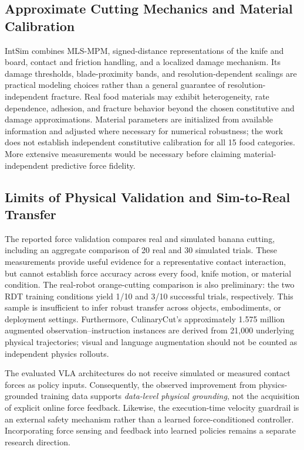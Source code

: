 \subsection{Approximate Cutting Mechanics and Material Calibration}
IntSim combines MLS-MPM, signed-distance representations of the knife and board, contact and friction handling, and a localized damage mechanism. Its damage thresholds, blade-proximity bands, and resolution-dependent scalings are practical modeling choices rather than a general guarantee of resolution-independent fracture. Real food materials may exhibit heterogeneity, rate dependence, adhesion, and fracture behavior beyond the chosen constitutive and damage approximations. Material parameters are initialized from available information and adjusted where necessary for numerical robustness; the work does not establish independent constitutive calibration for all 15 food categories. More extensive measurements would be necessary before claiming material-independent predictive force fidelity.

\subsection{Limits of Physical Validation and Sim-to-Real Transfer}
The reported force validation compares real and simulated banana cutting, including an aggregate comparison of 20 real and 30 simulated trials. These measurements provide useful evidence for a representative contact interaction, but cannot establish force accuracy across every food, knife motion, or material condition. The real-robot orange-cutting comparison is also preliminary: the two RDT training conditions yield 1/10 and 3/10 successful trials, respectively. This sample is insufficient to infer robust transfer across objects, embodiments, or deployment settings. Furthermore, CulinaryCut's approximately 1.575 million augmented observation--instruction instances are derived from 21,000 underlying physical trajectories; visual and language augmentation should not be counted as independent physics rollouts.

The evaluated VLA architectures do not receive simulated or measured contact forces as policy inputs. Consequently, the observed improvement from physics-grounded training data supports \emph{data-level physical grounding}, not the acquisition of explicit online force feedback. Likewise, the execution-time velocity guardrail is an external safety mechanism rather than a learned force-conditioned controller. Incorporating force sensing and feedback into learned policies remains a separate research direction.

